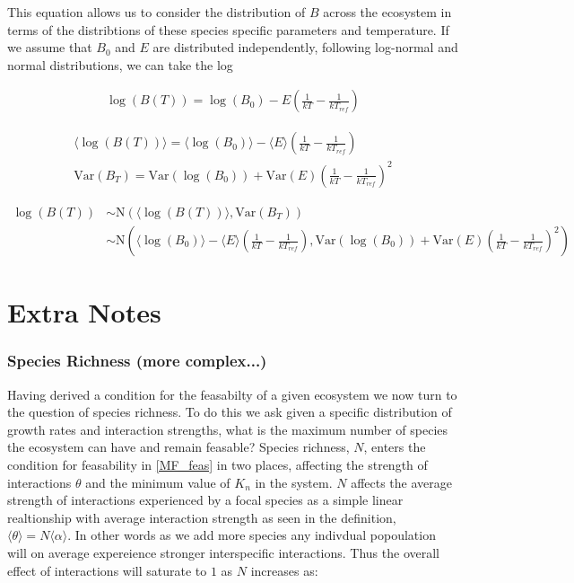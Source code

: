 \documentclass{article}
\begin{document}
This equation allows us to consider the distribution of $B$ across the ecosystem in terms of the distribtions of these species specific parameters and temperature. If we assume that $B_0$ and $E$ are distributed independently, following log-normal and normal distributions, we can take the log


\begin{align}
  \log(B(T)) = \log(B_0) -E \left(\frac{1}{kT} - \frac{1}{kT_{ref}} \right)
\end{align}


\begin{align}
  \langle \log(B(T)) \rangle  = \langle \log(B_0) \rangle - \langle E \rangle \left(\frac{1}{kT} - \frac{1}{kT_{ref}} \right)
  \\
  \text{Var}(B_T) = \text{Var}(\log(B_0)) + \text{Var}(E) \left(\frac{1}{kT} - \frac{1}{kT_{ref}} \right)^2
\end{align}

\begin{align}
  \log(B(T)) &\sim \text{N}(\langle \log(B(T)) \rangle  , \text{Var}(B_T))
  \\
  &\sim \text{N}(\langle \log(B_0) \rangle - \langle E \rangle \left(\frac{1}{kT} - \frac{1}{kT_{ref}} \right),
               \text{Var}(\log(B_0)) + \text{Var}(E) \left(\frac{1}{kT} - \frac{1}{kT_{ref}} \right)^2)
\end{align}

\section{Extra Notes}
\subsubsection{Species Richness (more complex...)}
Having derived a condition for the feasabilty of a given ecosystem we now turn to the question of species richness. To do this we ask given a specific distribution of growth rates and interaction strengths, what is the maximum number of species the ecosystem can have and remain feasable? Species richness, $N$, enters the condition for feasability in \cref{MF_feas} in two places, affecting the strength of interactions $\theta$ and the minimum value of $K_n$ in the system. $N$ affects the average strength of interactions experienced by a focal species as a simple linear realtionship with average interaction strength as seen in the definition, $\langle \theta \rangle = N \langle \alpha \rangle$. In other words as we add more species any indivdual popoulation will on average expereience stronger interspecific interactions. Thus the overall effect of interactions will saturate to $1$ as $N$ increases as:
\end{document}
